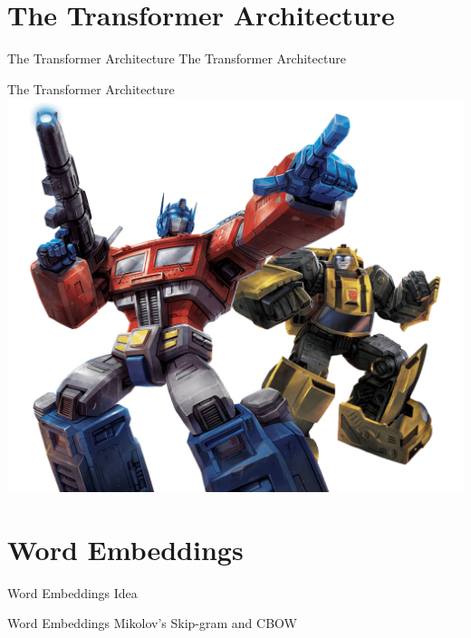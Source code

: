 \documentclass[aspectratio=169]{beamer}
\begin{document}
\section{The Transformer Architecture}

\begin{frame}{The Transformer Architecture}
{\Large The Transformer Architecture}
\end{frame}

\begin{frame}{The Transformer Architecture}
\includegraphics[width=\textwidth]{figures/optimus_prime_bumblebee}
\end{frame}

\section{Word Embeddings}

\begin{frame}{Word Embeddings}
Idea
\end{frame}

\begin{frame}{Word Embeddings}
Mikolov's Skip-gram and CBOW
\end{frame}
\end{document}
